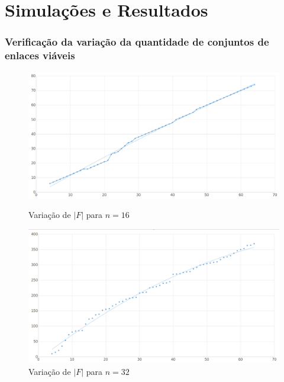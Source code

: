 \section{Simulações e Resultados}

\subsubsection{Verificação da variação da quantidade de conjuntos de enlaces viáveis}

\begin{figure}[ht] 
  \label{fig:tamanho} 
  \begin{minipage}[b]{0.5\linewidth}
    \centering
    \includegraphics[width=1\linewidth]{figs/tamanho16.png} 
    \caption{Variação de $|F|$ para $n=16$} 
    \vspace{4ex}
  \end{minipage}%
  \begin{minipage}[b]{0.5\linewidth}
    \centering
    \includegraphics[width=1\linewidth]{figs/tamanho32.png} 
    \caption{Variação de $|F|$ para $n=32$} 
    \vspace{4ex}
  \end{minipage} 
  \begin{minipage}[b]{0.5\linewidth}

\end{minipage}
\end{figure}
